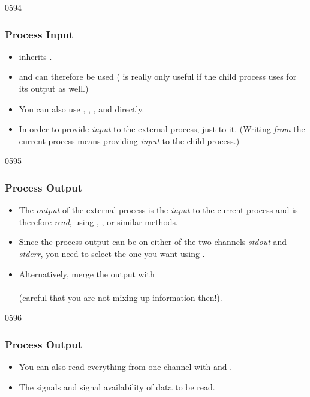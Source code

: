 \begin{slide}[fragile]{0594}
\frametitle{Process Input}
\begin{itemize}
\item {} inherits .
\item {} and  can therefore be used
  ( is really only useful if the child process uses
   for its output as well.)
\item You can also use , ,
  , and  directly.
\item In order to provide \emph{input} to the external process, just
   to it. (Writing \emph{from} the current process means  providing \emph{input} to the child process.)
\end{itemize}
\end{slide}

\begin{slide}{0595}
\frametitle{Process Output}
\begin{itemize}
\item The \emph{output} of the external process is the \emph{input} to
  the current process and is therefore \emph{read}, using
  , , or similar methods.
\item Since the process output can be on either of the two channels
  \emph{stdout} and \emph{stderr}, you need to select the one you want
  using .
\item Alternatively, merge the output with\\
  \\
  (careful that you are not mixing up information then!).
\end{itemize}
\end{slide}

\begin{slide}{0596}
\frametitle{Process Output}
\begin{itemize}
\item You can also read everything from one channel with
 and .
\item The signals  and
 signal availability of data to be read.
\end{itemize}
\end{slide}

